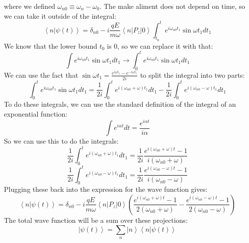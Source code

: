 \documentclass[12pt]{article}
\begin{document}
where we defined $\omega _{n0} \equiv \omega _n - \omega _0$. The make aliment does not depend on time, so we can take it outside of the integral:
\begin{equation}
\left\langle n|\psi(t)\right\rangle = \delta _{n0} -i \frac{q E}{m \omega} \left\langle n\left|P_{z}\right|0\right\rangle \int_{t_0}^t e^{i \omega _{n0} t_1} \sin \omega t_1 d t_1
\end{equation}
We know that the lower bound $t_0$ is 0, so we can replace it with that:
\begin{equation}
\int e^{i \omega _{n0} t_1} \sin \omega t_1 d t_1 \rightarrow \int_0^t e^{i \omega _{n0} t_1} \sin \omega t_1 d t_1
\end{equation}
We can use the fact that $\sin \omega t_1 = \frac{e^{i \omega t_1} - e^{-i \omega t_1}}{2i}$ to split the integral into two parts:
\begin{equation}
\int_0^t e^{i \omega _{n0} t_1} \sin \omega t_1 d t_1 = \frac{1}{2i} \int_0^t e^{i (\omega _{n0} + \omega) t_1} d t_1 - \frac{1}{2i} \int_0^t e^{i (\omega _{n0} - \omega) t_1} d t_1
\end{equation}
To do these integrals, we can use the standard definition of the integral of an exponential function:
\begin{equation}
\int e^{i \alpha t} d t = \frac{e^{i \alpha t}}{i \alpha}
\end{equation}
So we can use this to do the integrals:
\begin{equation}
\frac{1}{2i} \int_0^t e^{i (\omega _{n0} + \omega) t_1} d t_1 = \frac{1}{2i} \frac{e^{i (\omega _{n0} + \omega) t} - 1}{i (\omega _{n0} + \omega)}
\end{equation}
\begin{equation}
\frac{1}{2i} \int_0^t e^{i (\omega _{n0} - \omega) t_1} d t_1 = \frac{1}{2i} \frac{e^{i (\omega _{n0} - \omega) t} - 1}{i (\omega _{n0} - \omega)}
\end{equation}
Plugging these back into the expression for the wave function gives:
\begin{equation}
\left\langle n|\psi(t)\right\rangle = \delta _{n0} -i \frac{q E}{m \omega} \left\langle n\left|P_{z}\right|0\right\rangle \left( \frac{e^{i (\omega _{n0} + \omega) t} - 1}{2 (\omega _{n0} + \omega)} - \frac{e^{i (\omega _{n0} - \omega) t} - 1}{2 (\omega _{n0} - \omega)} \right)
\end{equation}
The total wave function will be a sum over these projections:
\begin{equation}
\left|\psi(t)\right\rangle = \sum _{n} \left|n\right\rangle \left\langle n|\psi(t)\right\rangle
\end{equation}
\end{document}
